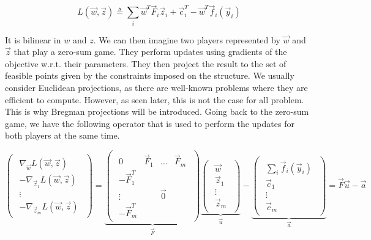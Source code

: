 \begin{equation}
  {L}(\vec w,\vec z) \triangleq \sum_i \vec w^T \vec F_i \vec z_i + \vec
c_i^T - \vec w^T \vec f_i(\vec y_i)
  \label{saddle_obj}
\end{equation}

It is bilinear in $w$ and $z$. We can then imagine two players represented by
$\vec w$ and $\vec z$ that play a zero-sum game. They perform updates using gradients of
the objective w.r.t. their parameters. They then project the result to the set
of feasible points given by the constraints imposed on the structure. We usually
consider Euclidean projections, as there are well-known problems where they are
efficient to compute. However, as seen later, this is not the case for all
problem. This is why Bregman projections will be introduced. Going back to the
zero-sum game, we have the following operator that is used to perform the
updates for both players at the same time.

\begin{equation}
  \begin{pmatrix}
    \begin{array}{c} \nabla_{\vec w} {L}(\vec w,\vec z)\\
      -\nabla_{\vec z_1} {L}(\vec w,\vec z)\\
      \vdots\\
      -\nabla_{\vec z_m} {L}(\vec w,\vec z)
    \end{array}
  \end{pmatrix} =
  \underbrace{
    \begin{pmatrix}
      \begin{array}{cccc}
        0 & \vec F_1 & \dots & \vec F_m\\
        -\vec F_1^T & & &\\
        \vdots & & \vec 0 &\\
        -\vec F_m^T & & &
      \end{array}
    \end{pmatrix}}_{\vec F}
  \underbrace{
    \begin{pmatrix}
      \begin{array}{c}
        \vec w\\
        \vec z_1\\
        \vdots\\
        \vec z_m
      \end{array}
    \end{pmatrix}}_{\vec u}-
  \underbrace{
    \begin{pmatrix}
      \begin{array}{c}
        \sum_i \vec f_i(\vec y_i)\\
        \vec c_1\\
        \vdots\\
        \vec c_m
      \end{array}
    \end{pmatrix}}_{\vec a} = \vec F \vec u - \vec a
  \end{equation}



